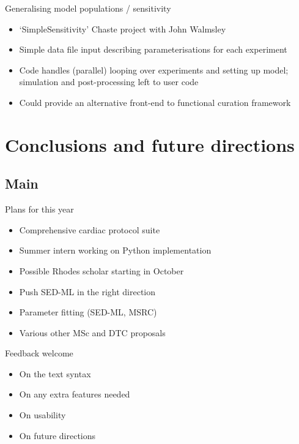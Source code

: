 \documentclass[t,xcolor={usenames,dvipsnames}]{beamer}
\begin{document}
\begin{frame}{Generalising model populations / sensitivity}
\begin{itemize}
\item `SimpleSensitivity' Chaste project with John Walmsley
\item Simple data file input describing parameterisations for each experiment
\item Code handles (parallel) looping over experiments and setting up model; simulation and post-processing left to user code
\item Could provide an alternative front-end to functional curation framework
\end{itemize}
\end{frame}

\section{Conclusions and future directions}
\subsection*{Main}

\begin{frame}{Plans for this year}
\begin{itemize}
\item Comprehensive cardiac protocol suite
\item Summer intern working on Python implementation
\item Possible Rhodes scholar starting in October
\item Push SED-ML in the right direction
\item Parameter fitting (SED-ML, MSRC)
\item Various other MSc and DTC proposals
\end{itemize}
\end{frame}


\begin{frame}{Feedback welcome}
\begin{itemize}
\item On the text syntax
\item On any extra features needed
\item On usability
\item On future directions
\end{itemize}
\end{frame}
\end{document}
